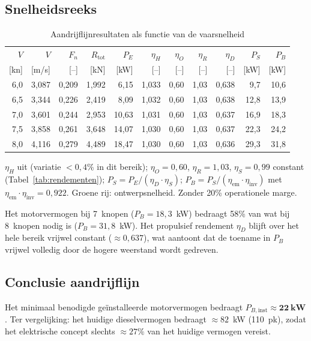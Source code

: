 \subsection{Snelheidsreeks}
\label{subsec:aandrijflijn-snelheidsreeks}

\begin{table}[H]
\centering
\caption{Aandrijflijnresultaten als functie van de vaarsnelheid}
\label{tab:aandrijflijn-snelheidsreeks}
\small
\begin{tabular}{rrrrrrrrrrr}
\toprule
$V$ & $V$ & $F_n$ & $R_\mathrm{tot}$ & $P_E$ &
$\eta_H$ & $\eta_O$ & $\eta_R$ & $\eta_D$ & $P_S$ & $P_B$ \\
{[kn]} & {[m/s]} & {[--]} & {[kN]} & {[kW]} &
{[--]} & {[--]} & {[--]} & {[--]} & {[kW]} & {[kW]} \\
\midrule
6{,}0 & 3{,}087 & 0{,}209 & 1{,}992 &  6{,}15 & 1{,}033 & 0{,}60 & 1{,}03 & 0{,}638 &  9{,}7 & 10{,}6 \\
6{,}5 & 3{,}344 & 0{,}226 & 2{,}419 &  8{,}09 & 1{,}032 & 0{,}60 & 1{,}03 & 0{,}638 & 12{,}8 & 13{,}9 \\
\rowcolor{green!12}
7{,}0 & 3{,}601 & 0{,}244 & 2{,}953 & 10{,}63 & 1{,}031 & 0{,}60 & 1{,}03 & 0{,}637 & 16{,}9 & 18{,}3 \\
7{,}5 & 3{,}858 & 0{,}261 & 3{,}648 & 14{,}07 & 1{,}030 & 0{,}60 & 1{,}03 & 0{,}637 & 22{,}3 & 24{,}2 \\
8{,}0 & 4{,}116 & 0{,}279 & 4{,}489 & 18{,}47 & 1{,}030 & 0{,}60 & 1{,}03 & 0{,}636 & 29{,}3 & 31{,}8 \\
\bottomrule
\end{tabular}
\vspace{4pt}

\noindent\footnotesize
$\eta_H$ uit \cite{spreadsheet_holtrop} (variatie $<0{,}4\%$ in dit bereik);
$\eta_O = 0{,}60$, $\eta_R = 1{,}03$, $\eta_S = 0{,}99$ constant
(Tabel~\ref{tab:rendementen}); $P_S = P_E/(\eta_D \cdot \eta_S)$;
$P_B = P_S/(\eta_\mathrm{em}\cdot\eta_\mathrm{inv})$ met
$\eta_\mathrm{em}\cdot\eta_\mathrm{inv} = 0{,}922$. Groene rij: ontwerpsnelheid.
Zonder 20\% operationele marge.
\end{table}

Het motorvermogen bij 7~knopen ($P_B = 18{,}3$~kW) bedraagt 58\% van wat bij
8~knopen nodig is ($P_B = 31{,}8$~kW). Het propulsief rendement $\eta_D$ blijft
over het hele bereik vrijwel constant ($\approx 0{,}637$), wat aantoont dat de
toename in $P_B$ vrijwel volledig door de hogere weerstand wordt gedreven.

\subsection{Conclusie aandrijflijn}
\label{subsec:aandrijflijn-conclusie}

Het minimaal benodigde geïnstalleerde motorvermogen bedraagt
$P_{B,\mathrm{inst}} \approx \mathbf{22\ kW}$. Ter vergelijking: het huidige
dieselvermogen bedraagt $\approx 82$~kW (110~pk), zodat het elektrische concept
slechts $\approx 27\%$ van het huidige vermogen vereist.